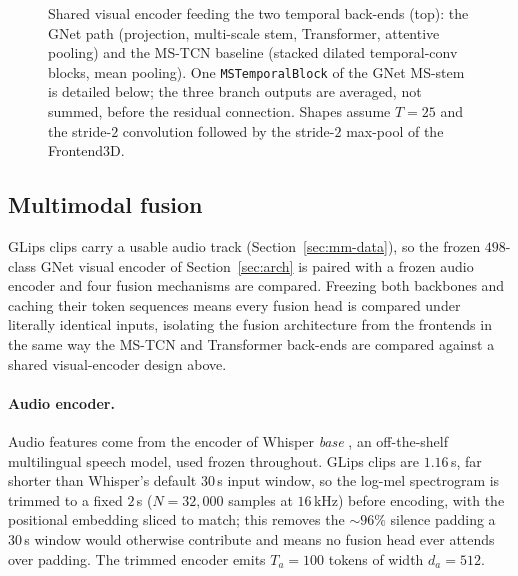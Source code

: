 \documentclass[10pt, a4paper]{article}
\begin{document}
\begin{figure}[!htb]
\caption{Shared visual encoder feeding the two temporal back-ends (top): the GNet path (projection, multi-scale stem, Transformer, attentive pooling) and the MS-TCN baseline (stacked dilated temporal-conv blocks, mean pooling). One \texttt{MSTemporalBlock} of the GNet MS-stem is detailed below; the three branch outputs are averaged, not summed, before the residual connection. Shapes assume $T{=}25$ and the stride-$2$ convolution followed by the stride-$2$ max-pool of the Frontend3D.}
\label{fig:arch}
\end{figure}
\subsection{Multimodal fusion}
\label{sec:mm}
\noindent GLips clips carry a usable audio track (Section~\ref{sec:mm-data}), so the frozen $498$-class GNet visual encoder of Section~\ref{sec:arch} is paired with a frozen audio encoder and four fusion mechanisms are compared. Freezing both backbones and caching their token sequences means every fusion head is compared under literally identical inputs, isolating the fusion architecture from the frontends in the same way the MS-TCN and Transformer back-ends are compared against a shared visual-encoder design above.
\paragraph{Audio encoder.} Audio features come from the encoder of Whisper \emph{base} \citep{radford2022whisper}, an off-the-shelf multilingual speech model, used frozen throughout. GLips clips are $1.16\,$s, far shorter than Whisper's default $30\,$s input window, so the log-mel spectrogram is trimmed to a fixed $2\,$s ($N=32{,}000$ samples at $16\,$kHz) before encoding, with the positional embedding sliced to match; this removes the $\sim\!96\%$ silence padding a $30\,$s window would otherwise contribute and means no fusion head ever attends over padding. The trimmed encoder emits $T_a = 100$ tokens of width $d_a = 512$.
\end{document}

